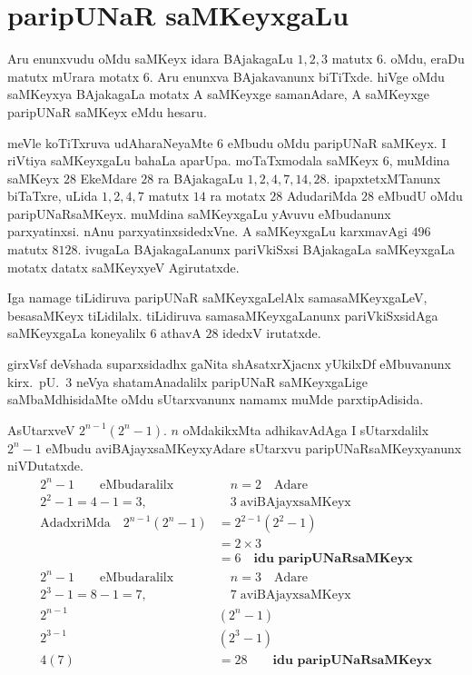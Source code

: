\chapter{paripUNaR saMKeyxgaLu}

\vskip -20pt

Aru enunxvudu oMdu saMKeyx idara BAjakagaLu $1,2,3$ matutx $6$. oMdu, eraDu matutx mUrara motatx $6$. 
Aru enunxva BAjakavanunx biTiTxde. hiVge oMdu saMKeyxya BAjakagaLa motatx A saMKeyxge samanAdare, A saMKeyxge paripUNaR saMKeyx eMdu hesaru.

meVle koTiTxruva  udAharaNeyaMte $6$ eMbudu oMdu paripUNaR saMKeyx. I riVtiya saMKeyxgaLu bahaLa aparUpa.  moTaTxmodala saMKeyx $6$, muMdina saMKeyx $28$ EkeMdare $28$ ra BAjakagaLu $1,2,4,7,14,28$. ipapxtetxMTanunx biTaTxre, uLida $1,2,4,7$ matutx $14$ ra motatx $28$ AdudariMda $28$ eMbudU oMdu paripUNaRsaMKeyx. muMdina saMKeyxgaLu yAvuvu eMbudanunx parxyatinxsi. nAnu parxyatinxsidedxVne. A saMKeyxgaLu karxmavAgi $496$ matutx $8128$. ivugaLa BAjakagaLanunx pariVkiSxsi BAjakagaLa saMKeyxgaLa motatx datatx saMKeyxyeV Agirutatxde.  

Iga namage tiLidiruva paripUNaR saMKeyxgaLelAlx samasaMKeyxgaLeV, besasaMKeyx tiLidilalx. tiLidiruva samasaMKeyxgaLanunx pariVkiSxsidAga saMKeyxgaLa koneyalilx $6$ athavA $28$ idedxV irutatxde.

girxVsf deVshada suparxsidadhx gaNita shAsatxrXjacnx yUkilxDf eMbuvanunx kirx.~pU.\ $3$ neVya shatamAnadalilx paripUNaR saMKeyxgaLige saMbaMdhisidaMte oMdu sUtarxvanunx namamx muMde parxtipAdisida.

AsUtarxveV $2^{n-1}(2^{n}-1)$. $n$ oMdakikxMta adhikavAdAga I sUtarxdalilx $2^{n}-1$ eMbudu aviBAjayxsaMKeyxyAdare sUtarxvu paripUNaRsaMKeyxyanunx niVDutatxde. 
\begin{align*}
2^{n}-1 \qquad\text{eMbudaralilx}&  \quad n=2 \quad\text{Adare}\\
2^{2}-1 = 4-1 =3, &\quad 3\;\text{aviBAjayxsaMKeyx}\\
\text{AdadxriMda}\quad 2^{n-1}(2^{n}-1) &= 2^{2-1}(2^{2}-1)\\
&=2\times 3\\
&=6 \quad \textbf{idu paripUNaRsaMKeyx}\\[0.1cm]%
2^{n}-1 \qquad\text{eMbudaralilx} &\quad n=3 \quad\text{Adare}\\
2^{3}-1 = 8-1 = 7, &\quad 7\; \text{aviBAjayxsaMKeyx}\\
2^{n-1}&(2^{n}-1)\\
2^{3-1}&(2^{3}-1)\\
4(7) &= 28 \qquad\textbf{idu paripUNaRsaMKeyx}
\end{align*}


